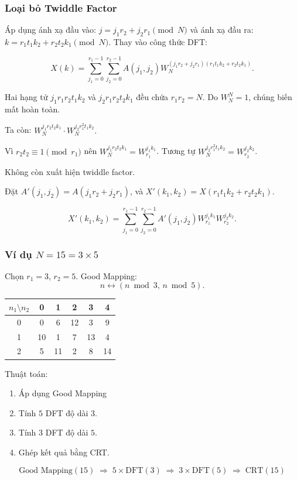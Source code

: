 \begin{frame}
\frametitle{Loại bỏ Twiddle Factor}


Áp dụng ánh xạ đầu vào: $j = j_1 r_2 + j_2 r_1 \pmod{N}$ và ánh xạ đầu ra: $k = r_1 t_1 k_2 + r_2 t_2 k_1 \pmod{N}$. Thay vào công thức DFT:

\[
X(k) = \sum_{j_1=0}^{r_1-1} \sum_{j_2=0}^{r_2-1} A(j_1, j_2) W_N^{(j_1 r_2 + j_2 r_1)(r_1 t_1 k_2 + r_2 t_2 k_1)}.
\]
\pause

Hai hạng tử $j_1 r_1 r_2 t_1 k_2$ và $j_2 r_1 r_2 t_2 k_1$ đều chứa $r_1 r_2 = N$. Do $W_N^N = 1$, chúng biến mất hoàn toàn.

Ta còn:
\(
W_N^{j_1 r_2 t_2 k_1} \cdot W_N^{j_2 r_1^2 t_1 k_2}.
\)

\pause

Vì $r_2 t_2 \equiv 1 \pmod{r_1}$ nên $W_N^{j_1 r_2 t_2 k_1} = W_{r_1}^{j_1 k_1}$. Tương tự $W_N^{j_2 r_1^2 t_1 k_2} = W_{r_2}^{j_2 k_2}$.

\pause

Không còn xuất hiện twiddle factor.

\pause

Đặt $A'(j_1, j_2) = A(j_1 r_2 + j_2 r_1)$, và $X'(k_1, k_2) = X(r_1 t_1 k_2 + r_2 t_2 k_1)$.

\[
X'(k_1, k_2) = \sum_{j_1=0}^{r_1-1} \sum_{j_2=0}^{r_2-1} A'(j_1, j_2) W_{r_1}^{j_1 k_1} W_{r_2}^{j_2 k_2}. \tag{29}
\]
\end{frame}
\begin{frame}
\frametitle{Ví dụ $N = 15 = 3 \times 5$}

Chọn $r_1 = 3$, $r_2 = 5$. Good Mapping:
\[
n \leftrightarrow (n \bmod 3,\, n \bmod 5).
\]

\pause
\begin{center}
\begin{tabular}{c|ccccc}
$n_1 \setminus n_2$ & 0 & 1 & 2 & 3 & 4 \\
\hline
0 & 0 & 6 & 12 & 3 & 9 \\
1 & 10 & 1 & 7 & 13 & 4 \\
2 & 5 & 11 & 2 & 8 & 14
\end{tabular}
\end{center}

\pause
Thuật toán:
\begin{enumerate}
\item Áp dụng Good Mapping
\item Tính $5$ DFT độ dài $3$.
\item Tính $3$ DFT độ dài $5$.
\item Ghép kết quả bằng CRT.
\end{enumerate}

\[
\text{Good Mapping}(15) \;\Rightarrow\; 5 \times \text{DFT}(3) \;\Rightarrow\; 3 \times \text{DFT}(5) \;\Rightarrow\; \text{CRT}(15)
\]

\end{frame}


